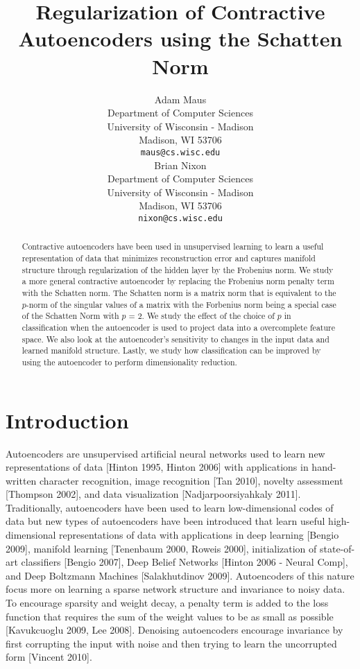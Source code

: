 \documentclass{article} %
\title{Regularization of Contractive Autoencoders using the Schatten Norm}
\author{
Adam Maus \\ 
Department of Computer Sciences \\
University of Wisconsin - Madison \\
Madison, WI 53706 \\
\texttt{maus@cs.wisc.edu} \\
\And
Brian Nixon \\
Department of Computer Sciences \\
University of Wisconsin - Madison \\
Madison, WI 53706 \\
\texttt{nixon@cs.wisc.edu} \\
}
\begin{document}
\maketitle

\begin{abstract}
Contractive autoencoders have been used in unsupervised learning to learn a useful representation of data that minimizes reconstruction error and captures manifold structure through regularization of the hidden layer by the Frobenius norm. We study a more general contractive autoencoder by replacing the Frobenius norm penalty term with the Schatten norm. The Schatten norm is a matrix norm that is equivalent to the $p$-norm of the singular values of a matrix with the Forbenius norm being a special case of the Schatten Norm with $p$ = 2. We study the effect of the choice of $p$ in classification when the autoencoder is used to project data into a overcomplete feature space. We also look at the autoencoder's sensitivity to changes in the input data and learned manifold structure. Lastly, we study how classification can be improved by using the autoencoder to perform dimensionality reduction.
\end{abstract}

\section{Introduction}

Autoencoders are unsupervised artificial neural networks used to learn new representations of data [Hinton 1995, Hinton 2006] with applications in hand-written character recognition, image recognition [Tan 2010], novelty assessment [Thompson 2002], and data visualization [Nadjarpoorsiyahkaly 2011]. Traditionally, autoencoders have been used to learn low-dimensional codes of data but new types of autoencoders have been introduced that learn useful high-dimensional representations of data with applications in deep learning [Bengio 2009], manifold learning [Tenenbaum 2000, Roweis 2000], initialization of state-of-art classifiers [Bengio 2007], Deep Belief Networks [Hinton 2006 - Neural Comp], and Deep Boltzmann Machines [Salakhutdinov 2009]. Autoencoders of this nature focus more on learning a sparse network structure and invariance to noisy data. To encourage sparsity and weight decay, a penalty term is added to the loss function that requires the sum of the weight values to be as small as possible [Kavukcuoglu 2009, Lee 2008]. Denoising autoencoders encourage invariance by first corrupting the input with noise and then trying to learn the uncorrupted form [Vincent 2010]. 
\end{document}
